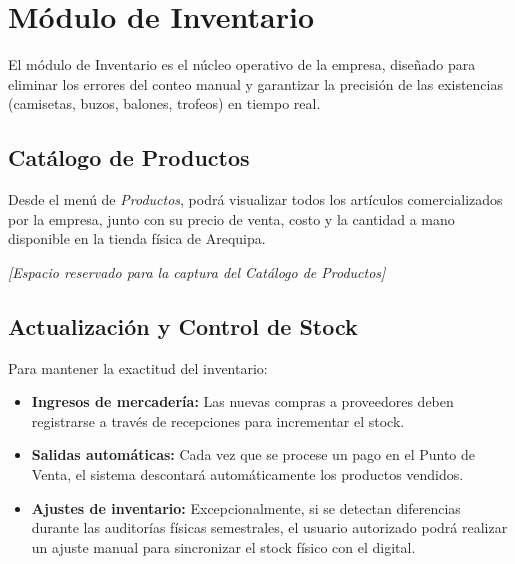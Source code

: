 \section{Módulo de Inventario}

El módulo de Inventario es el núcleo operativo de la empresa, diseñado para eliminar los errores del conteo manual y garantizar la precisión de las existencias (camisetas, buzos, balones, trofeos) en tiempo real.

\subsection{Catálogo de Productos}

Desde el menú de \textit{Productos}, podrá visualizar todos los artículos comercializados por la empresa, junto con su precio de venta, costo y la cantidad a mano disponible en la tienda física de Arequipa.

\vspace{1cm}
\begin{center}
\textit{[Espacio reservado para la captura del Catálogo de Productos]}
\end{center}
\vspace{1cm}

\subsection{Actualización y Control de Stock}

Para mantener la exactitud del inventario:
\begin{itemize}
    \item \textbf{Ingresos de mercadería:} Las nuevas compras a proveedores deben registrarse a través de recepciones para incrementar el stock.
    \item \textbf{Salidas automáticas:} Cada vez que se procese un pago en el Punto de Venta, el sistema descontará automáticamente los productos vendidos.
    \item \textbf{Ajustes de inventario:} Excepcionalmente, si se detectan diferencias durante las auditorías físicas semestrales, el usuario autorizado podrá realizar un ajuste manual para sincronizar el stock físico con el digital.
\end{itemize}
